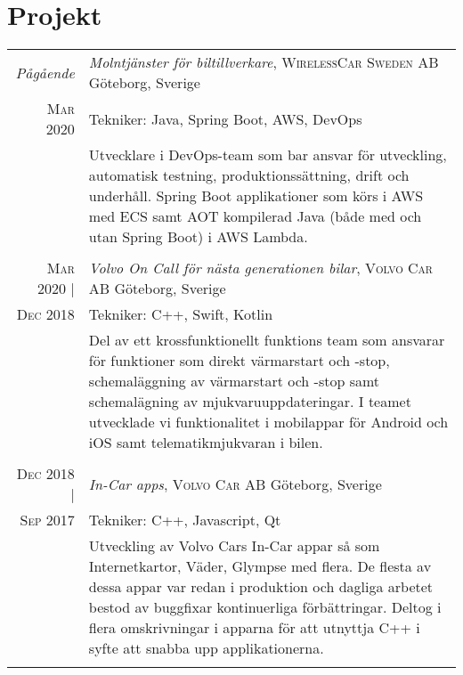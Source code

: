\documentclass[a4paper,10pt]{scrartcl} %
\begin{document}
\section{Projekt}
\begin{tabular}{r|p{15cm}}


\emph{Pågående} 	                & \emph{Molntjänster för biltillverkare}, \textsc{WirelessCar Sweden AB} \hfill Göteborg, Sverige \\
\textsc{Mar 2020}                   & \footnotesize{Tekniker: Java, Spring Boot, AWS, DevOps} \\
\phantom{abcdefghijklm}             & \footnotesize{Utvecklare i DevOps-team som bar ansvar för utveckling, automatisk testning, produktionssättning, drift och underhåll. Spring Boot applikationer som körs i AWS med ECS samt AOT kompilerad Java (både med och utan Spring Boot) i AWS Lambda.}\\
\multicolumn{2}{c}{} \\


\textsc{Mar 2020} |                 & \emph{Volvo On Call för nästa generationen bilar}, \textsc{Volvo Car AB} \hfill Göteborg, Sverige \\
\textsc{Dec 2018}                   & \footnotesize{Tekniker: C++, Swift, Kotlin} \\
\phantom{abcdefghijklm}             & \footnotesize{Del av ett krossfunktionellt funktions team som ansvarar för funktioner som direkt värmarstart och -stop, schemaläggning av värmarstart och -stop samt schemalägning av mjukvaruuppdateringar. I teamet utvecklade vi funktionalitet i mobilappar för Android och iOS samt telematikmjukvaran i bilen. }\\
\multicolumn{2}{c}{} \\


\textsc{Dec 2018} | 	            & \emph{In-Car apps}, \textsc{Volvo Car AB} \hfill Göteborg, Sverige \\
\textsc{Sep 2017}                   & \footnotesize{Tekniker: C++, Javascript, Qt} \\
\phantom{abcdefghijklm}             & \footnotesize{Utveckling av Volvo Cars In-Car appar så som Internetkartor, Väder, Glympse med flera. De flesta av dessa appar var redan i produktion och dagliga arbetet bestod av buggfixar kontinuerliga förbättringar. Deltog i flera omskrivningar i apparna för att utnyttja C++ i syfte att snabba upp applikationerna.}\\
\multicolumn{2}{c}{} \\


\end{tabular}
\end{document}
